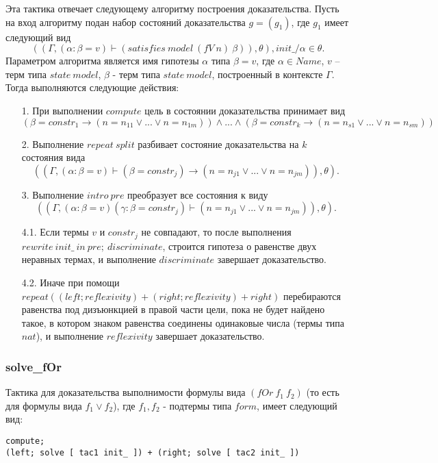 \documentclass[12pt]{article}
\begin{document}
Эта тактика отвечает следующему алгоритму построения доказательства.
Пусть на вход алгоритму подан набор состояний доказательства $g = (g_1)$, где $g_1$ имеет следующий вид $$((\Gamma, (\alpha: \beta = v) \vdash (satisfies\ model\ (fV\ n)\ \beta)), \theta), init\_/\alpha \in \theta.$$ Параметром алгоритма является имя гипотезы $\alpha$ типа $\beta = v$, где $\alpha \in Name$, $v$ -- терм типа $state\ model$, $\beta$ - терм типа $state\ model$, построенный в контексте $\Gamma$. 
Тогда выполняются следующие действия:
\begin{enumerate}
    \item[1.] При выполнении $compute$ цель в состоянии доказательства принимает вид
    $$(\beta=constr_1 \xrightarrow{} (n=n_{11} \vee ... \vee n=n_{1m})) \wedge ... \wedge (\beta=constr_k \xrightarrow{} (n=n_{s1} \vee ... \vee n=n_{sm})) $$
    \item[2.] Выполнение $repeat\ split$ разбивает состояние доказательства на $k$ состояния вида
    $$((\Gamma, (\alpha: \beta = v) \vdash (\beta=constr_j) \xrightarrow{} (n=n_{j1} \vee ... \vee n=n_{jm})), \theta).$$
    \item[3.] Выполнение $intro\ pre$ преобразует все состояния к виду 
    $$((\Gamma,  (\alpha: \beta = v) (\gamma: \beta=constr_j) \vdash (n=n_{j1} \vee ... \vee n=n_{jm})), \theta).$$
    \item[4.1.] Если термы $v$ и $constr_j$ не совпадают, то после выполнения $rewrite\ init\_\ in\ pre;\ discriminate$, строится гипотеза о равенстве двух неравных термах, и выполнение $discriminate$ завершает доказательство.
    \item[4.2.] Иначе при помощи $repeat ( (left; reflexivity) + (right; reflexivity) + right)$ перебираются равенства под дизъюнкцией в правой части цели, пока не будет найдено такое, в котором знаком равенства соединены одинаковые числа (термы типа $nat$), и выполнение $reflexivity$ завершает доказательство.
\end{enumerate}

\subsubsection{solve\_fOr} 
Тактика для доказательства выполнимости формулы вида $(fOr\ f_1\ f_2)$ (то есть для формулы вида $f_1 \vee f_2$), где $f_1,f_2$ - подтермы типа $form$, имеет следующий вид:
\begin{verbatim}
compute;
(left; solve [ tac1 init_ ]) + (right; solve [ tac2 init_ ]) 
\end{verbatim}
\end{document}
